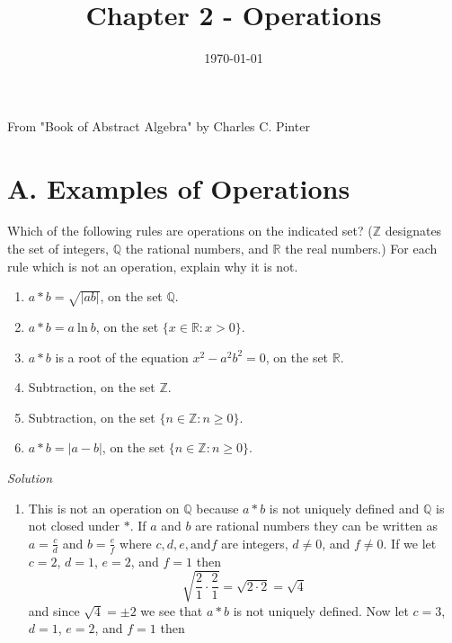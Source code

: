 \documentclass[12pt]{article}
\begin{document}
\title{Chapter 2 - Operations}
\date{\today}
\maketitle

\begin{flushleft}

From "Book of Abstract Algebra" by Charles C. Pinter
  
\section*{A. Examples of Operations}
Which of the following rules are operations on the indicated set? ($\mathbb{Z}$ 
designates the set of integers, $\mathbb{Q}$ the rational numbers, and $\mathbb{R}$ 
the real numbers.) For each rule which is not an operation, explain why it is not.
  \begin{enumerate}
    \item $a * b = \sqrt{|ab|}$, on the set $\mathbb{Q}$.
    \item $a * b = a~\text{ln}~b$, on the set $\{x \in \mathbb{R}: x > 0\}$.
    \item $a * b$ is a root of the equation $x^{2} - a^{2}b^{2} = 0$, on the set $\mathbb{R}$.
    \item Subtraction, on the set $\mathbb{Z}$.
    \item Subtraction, on the set $\{ n \in \mathbb{Z}:n \geq 0 \}$.
    \item $a * b = |a-b|$, on the set $\{ n \in \mathbb{Z}: n \geq 0 \}$.
  \end{enumerate}
  \textit{Solution} \\
  \begin{enumerate}
    \item This is not an operation on $\mathbb{Q}$ because $a * b$ is not uniquely defined 
      and $\mathbb{Q}$ is not closed under $*$. If $a$ and $b$ are rational numbers they can 
      be written as $a = \frac{c}{d}$ and $b = \frac{e}{f}$ where $c, d, e, \text{and} f$ are 
      integers, $d \neq 0$, and $f \neq 0$. If we let $c = 2$, $d = 1$, $e = 2$, and $f = 1$ then
        \begin{equation*}
          \sqrt{ \frac{2}{1} \cdot \frac{2}{1} } = \sqrt{ 2 \cdot 2 } = \sqrt{4}
        \end{equation*}
      and since $ \sqrt{4} = \pm 2$ we see that $a * b$ is not uniquely defined. Now let $c = 3$, $d = 1$, 
      $e = 2$, and $f = 1$ then
            \begin{equation*}

\end{equation*}
\end{enumerate}
\end{flushleft}
\end{document}
